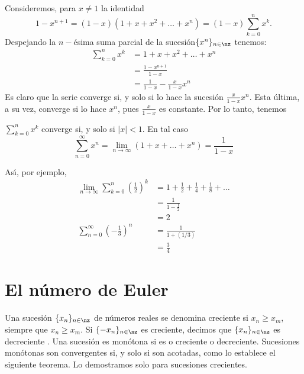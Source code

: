 Consideremos, para $x\neq1$ la identidad
\[
1-x^{n+1}=(1-x)(1+x+x^{2}+\dots+x^{n})=(1-x)\sum_{k=0}^{n}x^{k}.
\]
Despejando la $n-$\'{e}sima suma parcial de la sucesi\'{o}n$\{x^{n}%
\}_{n\in\nz}$ tenemos:
\begin{align*}
\sum_{k=0}^{n}x^{k}  &  =1+x+x^{2}+\dots+x^{n}\\
&  =\frac{1-x^{n+1}}{1-x}\\
&  =\frac{1}{1-x}-\frac{x}{1-x}x^{n}%
\end{align*}
Es claro que la serie converge si, y solo si lo hace la sucesi\'{o}n $\frac
{x}{1-x}x^{n}$. Esta \'{u}ltima, a su vez, converge si lo hace $x^{n}$, pues
$\frac{x}{1-x}$ es constante. Por lo tanto, tenemos

\begin{corollary}
\label{seriegeometrica} $\sum_{k=0}^{n} x^{k}$ converge si, y solo si $\vert x
\vert<1$. En tal caso
\begin{equation}
\label{convergeometrica}\sum_{n=0}^{\infty}x^{n}=\lim_{n\to\infty}
(1+x+\dots+x^{n})=\frac{1}{1-x}%
\end{equation}

\end{corollary}

As\'{\i}, por ejemplo,
\begin{align*}
\lim_{n\rightarrow\infty}\sum_{k=0}^{n}\left(  \frac{1}{2}\right)  ^{k}  &
=1+\frac{1}{2}+\frac{1}{4}+\frac{1}{8}+\dots\\
&  =\frac{1}{1-\frac{1}{2}}\\
&  =2\\
\sum_{n=0}^{\infty}\left(  -\frac{1}{3}\right)  ^{n}  &  =\frac{1}{1+(1/3)}\\
&  =\frac{3}{4}%
\end{align*}


\section*{El n\'{u}mero de Euler}

Una sucesi\'{o}n $\{x_{n}\}_{n\in\nz}$ de n\'{u}meros reales se denomina
creciente%
si $x_{n}\geq x_{m}$, siempre que $x_{n}\geq x_{m}$. Si $\{-x_{n}\}_{n\in\nz}$
es creciente, decimos que $\{x_{n}\}_{n\in\nz}$ es decreciente%
%
. Una sucesi\'{o}n
%
es mon\'{o}tona si es o creciente o decreciente. Sucesiones mon\'{o}tonas son
convergentes si, y solo si son acotadas, como lo establece el siguiente
teorema. Lo demostramos solo para sucesiones crecientes.


